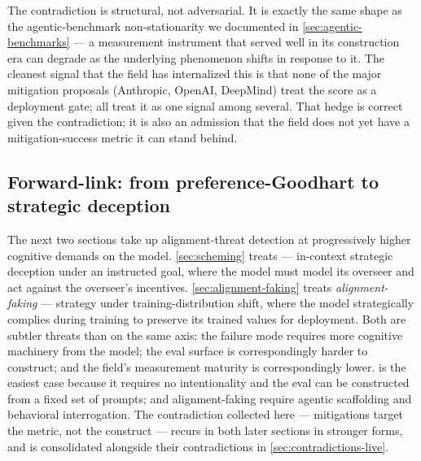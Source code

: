 The contradiction is structural, not adversarial. It is exactly the
same shape as the agentic-benchmark non-stationarity we documented in
\cref{sec:agentic-benchmarks} --- a measurement instrument that
served well in its construction era can degrade as the underlying
phenomenon shifts in response to it. The cleanest signal that the
field has internalized this is that none of the major mitigation
proposals (Anthropic, OpenAI, DeepMind) treat the 
score as a deployment gate; all treat it as one signal among
several. That hedge is correct given the contradiction; it is also
an admission that the field does not yet have a mitigation-success
metric it can stand behind.

\subsection{Forward-link: from preference-Goodhart to strategic deception}
\label{sec:sycophancy-forward}

The next two sections take up alignment-threat detection at progressively
higher cognitive demands on the model. \cref{sec:scheming} treats
\emph{} --- in-context strategic deception under an instructed
goal, where the model must model its overseer and act against the
overseer's incentives. \cref{sec:alignment-faking} treats
\emph{alignment-faking} --- strategy under training-distribution shift,
where the model strategically complies during training to preserve its
trained values for deployment. Both are subtler threats than
 on the same axis: the failure mode requires more cognitive
machinery from the model; the eval surface is correspondingly harder
to construct; and the field's measurement maturity is correspondingly
lower.  is the easiest case because it requires no
intentionality and the eval can be constructed from a fixed set of
prompts;  and alignment-faking require agentic scaffolding and
behavioral interrogation. The contradiction collected here ---
mitigations target the metric, not the construct --- recurs in both
later sections in stronger forms, and is consolidated alongside their
contradictions in \cref{sec:contradictions-live}.
